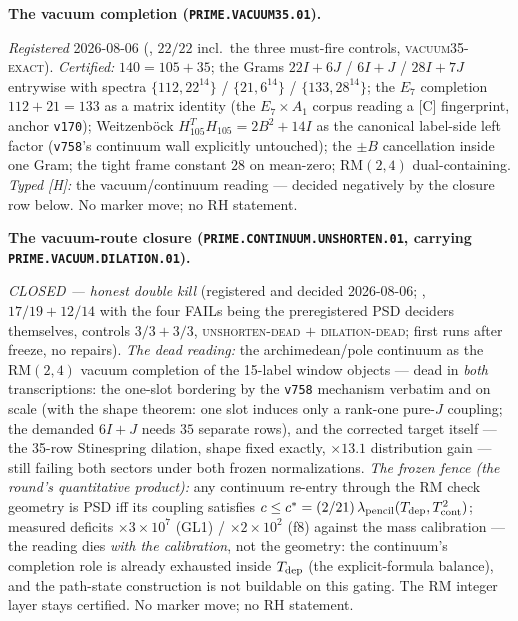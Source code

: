 \par\smallskip\noindent\textbf{The vacuum completion
(\texttt{PRIME.VACUUM35.01}).}
{\sloppy
\emph{Registered} 2026-08-06
(, $22/22$ incl.\ the three
must-fire controls, \textsc{vacuum35-exact}).  \emph{Certified:}
$140=105+35$; the Grams $22I{+}6J$ / $6I{+}J$ / $28I{+}7J$
entrywise with spectra $\{112,22^{14}\}$ / $\{21,6^{14}\}$ /
$\{133,28^{14}\}$; the $E_7$ completion $112+21=133$ as a matrix
identity (the $E_7\times A_1$ corpus reading a [C] fingerprint,
anchor \texttt{v170}); Weitzenb\"ock
$H_{105}^TH_{105}=2B^2+14I$ as the canonical label-side left
factor (\texttt{v758}'s continuum wall explicitly untouched); the
$\pm B$ cancellation inside one Gram; the tight frame constant
$28$ on mean-zero; $\mathrm{RM}(2,4)$ dual-containing.
\emph{Typed [H]:} the vacuum/continuum reading --- decided
negatively by the closure row below.  No marker move; no RH
statement.\par}


\par\smallskip\noindent\textbf{The vacuum-route closure
(\texttt{PRIME.CONTINUUM.UNSHORTEN.01}, carrying
\texttt{PRIME.VACUUM.DILATION.01}).}
{\sloppy
\emph{CLOSED --- honest double kill} (registered and decided
2026-08-06; , $17/19 +
12/14$ with the four FAILs being the preregistered PSD deciders
themselves, controls $3/3+3/3$, \textsc{unshorten-dead} $+$
\textsc{dilation-dead}; first runs after freeze, no repairs).
\emph{The dead reading:} the archimedean/pole continuum as the
$\mathrm{RM}(2,4)$ vacuum completion of the 15-label window
objects --- dead in \emph{both} transcriptions: the one-slot
bordering by the \texttt{v758} mechanism verbatim and on scale
(with the shape theorem: one slot induces only a rank-one
pure-$J$ coupling; the demanded $6I{+}J$ needs $35$ separate
rows), and the corrected target itself --- the 35-row Stinespring
dilation, shape fixed exactly, $\times13.1$ distribution gain ---
still failing both sectors under both frozen normalizations.
\emph{The frozen fence (the round's quantitative product):} any
continuum re-entry through the RM check geometry is PSD iff its
coupling satisfies $c\le c^*=(2/21)\,\lambda_{\rm pencil}
(T_{\rm dep},T_{\rm cont}^2)$; measured deficits
$\times3\times10^7$ (GL1) / $\times2\times10^2$ (f8) against the
mass calibration --- the reading dies \emph{with the
calibration}, not the geometry: the continuum's completion role
is already exhausted inside $T_{\rm dep}$ (the explicit-formula
balance), and the path-state construction is not buildable on
this gating.  The RM integer layer stays certified.  No marker
move; no RH statement.\par}


